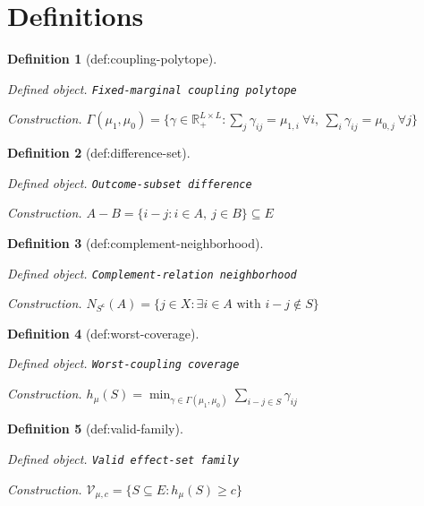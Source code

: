 \documentclass{article}
\newtheorem{definition}{Definition}
\begin{document}
\section{Definitions}

\begin{definition}[def:coupling-polytope]\label{def:coupling-polytope}
\par\smallskip\noindent\emph{Defined object.} \texttt{Fixed-\allowbreak{}marginal coupling polytope}
\par\smallskip\noindent\emph{Construction.} \(\Gamma(\mu_1,\mu_0)=\{\gamma\in\mathbb R_{+}^{L\times L}:\sum_j\gamma_{ij}=\mu_{1,i}\ \forall i,\ \sum_i\gamma_{ij}=\mu_{0,j}\ \forall j\}\)
\end{definition}

\begin{definition}[def:difference-set]\label{def:difference-set}
\par\smallskip\noindent\emph{Defined object.} \texttt{Outcome-\allowbreak{}subset difference}
\par\smallskip\noindent\emph{Construction.} \(A-B=\{i-j:i\in A,\ j\in B\}\subseteq E\)
\end{definition}

\begin{definition}[def:complement-neighborhood]\label{def:complement-neighborhood}
\par\smallskip\noindent\emph{Defined object.} \texttt{Complement-\allowbreak{}relation neighborhood}
\par\smallskip\noindent\emph{Construction.} \(N_{S^{\mathsf c}}(A)=\{j\in X:\exists i\in A\text{ with }i-j\notin S\}\)
\end{definition}

\begin{definition}[def:worst-coverage]\label{def:worst-coverage}
\par\smallskip\noindent\emph{Defined object.} \texttt{Worst-\allowbreak{}coupling coverage}
\par\smallskip\noindent\emph{Construction.} \(h_{\mu}(S)=\min_{\gamma\in\Gamma(\mu_1,\mu_0)}\sum_{i-j\in S}\gamma_{ij}\)
\end{definition}

\begin{definition}[def:valid-family]\label{def:valid-family}
\par\smallskip\noindent\emph{Defined object.} \texttt{Valid effect-\allowbreak{}set family}
\par\smallskip\noindent\emph{Construction.} \(\mathcal V_{\mu,c}=\{S\subseteq E:h_{\mu}(S)\geq c\}\)
\end{definition}
\end{document}
